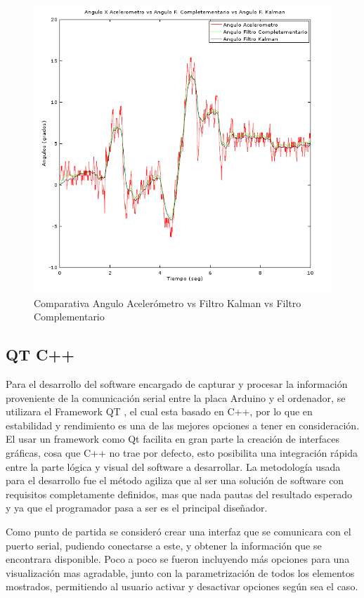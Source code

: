 \documentclass[12pt,a4paper]{article}
\begin{document}
\begin{figure}[H]
\centering
  \includegraphics[scale=0.7]{images/angKalCom}
  \caption{Comparativa Angulo Acelerómetro vs Filtro Kalman vs Filtro Complementario}
  \label{fig:AnguloXvsFiltros}
\end{figure}


\subsection{QT C++}
Para el desarrollo del software encargado de capturar y procesar la información proveniente de la comunicación serial entre la placa Arduino y el ordenador, se utilizara el Framework QT \cite{QT}, el cual esta basado en C++, por lo que en estabilidad y rendimiento es una de las mejores opciones a tener en consideración.
El usar un framework como Qt facilita en gran parte la creación de interfaces gráficas, cosa que C++ no trae por defecto, esto posibilita una integración rápida entre la parte lógica y visual del software a desarrollar.
La metodología usada para el desarrollo fue el método agiliza que al ser una solución de software con requisitos completamente definidos, mas que nada pautas del resultado esperado y ya que el programador pasa a ser es el principal diseñador.

Como punto de partida se consideró crear una interfaz que se comunicara con el puerto serial, pudiendo conectarse a este, y obtener la información que se encontrara disponible.
Poco a poco se fueron incluyendo más opciones para una visualización mas agradable, junto con la parametrización de todos los elementos mostrados, permitiendo al usuario activar y desactivar opciones según sea el caso.
\end{document}
